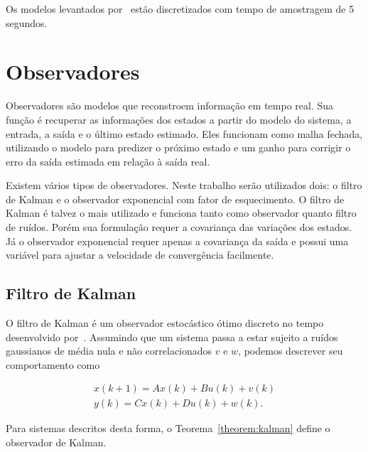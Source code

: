 Os modelos levantados por~\textcite{masterthesis:nelson} estão discretizados com
tempo de amostragem de 5 segundos.

\section{Observadores}%
\label{sec:observers}

Observadores são modelos que reconstroem informação em tempo real. Sua função é
recuperar as informações dos estados a partir do modelo do sistema, a entrada, a
saída e o último estado estimado. Eles funcionam como malha fechada, utilizando
o modelo para predizer o próximo estado e um ganho para corrigir o erro da saída
estimada em relação à saída real.

Existem vários tipos de observadores. Neste trabalho serão utilizados dois: o
filtro de Kalman e o observador exponencial com fator de esquecimento. O filtro
de Kalman é talvez o mais utilizado e funciona tanto como observador quanto
filtro de ruídos. Porém sua formulação requer a covariança das variações dos
estados. Já o observador exponencial requer apenas a covariança da saída e
possui uma variável para ajustar a velocidade de convergência facilmente.

\subsection{Filtro de Kalman}%
\label{subsec:kalman}

O filtro de Kalman é um observador estocástico ótimo discreto no tempo
desenvolvido por~\textcite{Kalman1960}. Assumindo que um sistema passa a estar
sujeito a ruídos gaussianos de média nula e não correlacionados \( v \) e \( w
\), podemos descrever seu comportamento como

\begin{equation}
	\label{eq:observer-noisy-model}
	\begin{split}
		x(k+1) = Ax(k) + Bu(k) + v(k) \\
		y(k) = Cx(k) +Du(k) + w(k).
	\end{split}
\end{equation}

Para sistemas descritos desta forma, o Teorema~\ref{theorem:kalman} define o
observador de Kalman.

